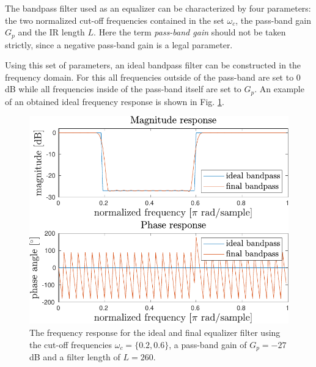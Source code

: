 \documentclass[journal]{IEEEtran}
\begin{document}
The bandpass filter used as an equalizer can be characterized by four parameters: the two normalized cut-off frequencies contained in the set $\omega_c$, the pass-band gain $G_p$ and the IR length $L$. Here the term \textit{pass-band gain} should not be taken strictly, since a negative pass-band gain is a legal parameter. 

Using this set of parameters, an ideal bandpass filter can be constructed in the frequency domain. For this all frequencies outside of the pass-band are set to 0 dB while all frequencies inside of the pass-band itself are set to $G_p$. An example of an obtained ideal frequency response is shown in Fig. \ref{fig:eq}.

\begin{figure}
    \centering
    \includegraphics[width=\columnwidth]{assignment_02/plots/equalizer.pdf}
    \caption{The frequency response for the ideal and final equalizer filter using the cut-off frequencies $\omega_c=\{0.2,0.6\}$, a pass-band gain of $G_p=-27$ dB and a filter length of $L=260$.}
    \label{fig:eq}
\end{figure}
\end{document}
